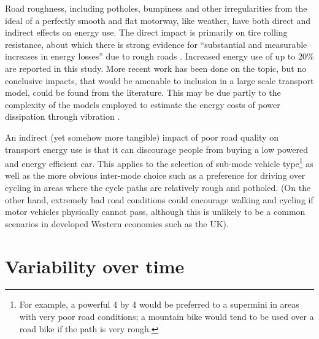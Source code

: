 \documentclass[a4paper, 11pt, twoside]{Thesis}
\begin{document}
Road roughness, including potholes, bumpiness and other irregularities
from the ideal of a perfectly smooth and flat motorway, like weather, have
both direct and indirect effects on energy use. The direct impact is primarily
on tire rolling resistance, about which there is strong evidence for
``substantial and measurable increases in energy losses'' due to
rough roads \citep{velinsky1980vehicle}. Increased energy use of up to
20\% are reported in this study. More recent work has been done on the topic,
but no conclusive impacts, that would be amenable to inclusion in a
large scale transport model, could be found from the literature.
This may be due partly to the complexity of the models employed to
estimate the energy costs of power dissipation through vibration
\citep{smith2011power}.

An indirect (yet somehow more tangible) impact of poor road quality on
transport energy use is that it can discourage people from buying
a low powered and energy efficient car.
This applies to the selection of sub-mode vehicle
type\footnote{For example,
a powerful 4 by 4 would be
preferred to a supermini in areas with very poor road conditions; a
mountain bike would tend to be used over a road bike if the path is
very rough.
}
as well as the more obvious inter-mode choice such as a
preference for driving over cycling
in areas where the cycle paths are relatively rough and potholed.
(On the other hand, extremely bad road conditions could encourage
walking and cycling if motor vehicles physically cannot pass, although
this is unlikely to be a common scenarios in developed Western economies
such as the UK). 


\section{Variability over time} 
\label{s:eff-imps}
\end{document}
